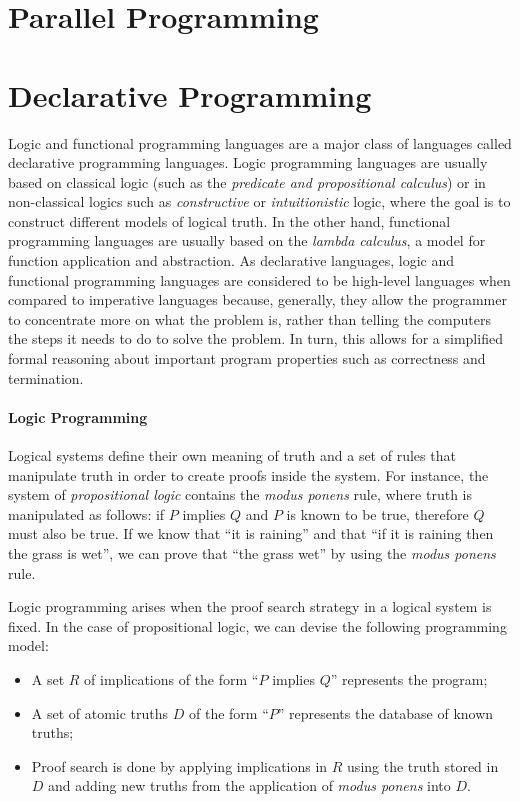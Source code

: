 \section{Parallel Programming}

\section{Declarative Programming}

Logic and functional programming languages are a major class of languages called
declarative programming languages. Logic programming languages are usually based
on classical logic (such as the \emph{predicate and propositional calculus}) or
in non-classical logics such as \emph{constructive} or \emph{intuitionistic}
logic, where the goal is to construct different models of logical truth.  In the
other hand, functional programming languages are usually based on the
\emph{lambda calculus}, a model for function application and abstraction. As
declarative languages, logic and functional programming languages are considered
to be high-level languages when compared to imperative languages because,
generally, they allow the programmer to concentrate more on what the problem is,
rather than telling the computers the steps it needs to do to solve the problem.
In turn, this allows for a simplified formal reasoning about important program
properties such as correctness and termination.

\paragraph{Logic Programming}

Logical systems define their own meaning of truth and a set of rules that
manipulate truth in order to create proofs inside the system.  For instance, the
system of \emph{propositional logic} contains the \emph{modus ponens} rule,
where truth is manipulated as follows: if $P$ implies $Q$ and $P$ is known to be
true, therefore $Q$ must also be true. If we know that ``it is raining'' and
that ``if it is raining then the grass is wet'', we can prove that ``the grass
wet'' by using the \emph{modus ponens} rule.

Logic programming arises when the proof search strategy in a logical system is
fixed. In the case of propositional logic, we can devise the following
programming model:

\begin{itemize}
   \item A set $R$ of implications of the form ``$P$ implies $Q$'' represents the
      program;
   \item A set of atomic truths $D$ of the form ``$P$'' represents the database of
      known truths;
   \item Proof search is done by applying implications in $R$ using the truth
      stored in $D$ and adding new truths from the application of \emph{modus
      ponens} into $D$.
\end{itemize}

